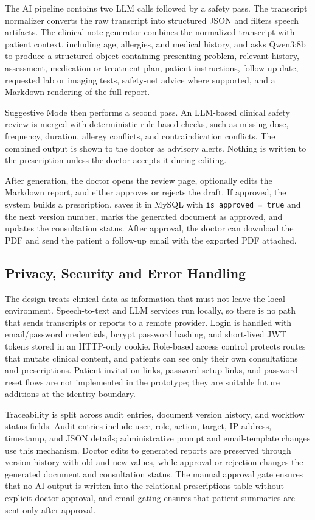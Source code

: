 The AI pipeline contains two LLM calls followed by a safety pass. The transcript normalizer converts the raw transcript into structured JSON and filters speech artifacts. The clinical-note generator combines the normalized transcript with patient context, including age, allergies, and medical history, and asks Qwen3:8b to produce a structured object containing presenting problem, relevant history, assessment, medication or treatment plan, patient instructions, follow-up date, requested lab or imaging tests, safety-net advice where supported, and a Markdown rendering of the full report.

Suggestive Mode then performs a second pass. An LLM-based clinical safety review is merged with deterministic rule-based checks, such as missing dose, frequency, duration, allergy conflicts, and contraindication conflicts. The combined output is shown to the doctor as advisory alerts. Nothing is written to the prescription unless the doctor accepts it during editing.

After generation, the doctor opens the review page, optionally edits the Markdown report, and either approves or rejects the draft. If approved, the system builds a prescription, saves it in MySQL with \texttt{is\_approved = true} and the next version number, marks the generated document as approved, and updates the consultation status. After approval, the doctor can download the PDF and send the patient a follow-up email with the exported PDF attached.

\subsection{Privacy, Security and Error Handling}
\label{subsec:privacy-security-error-handling}

The design treats clinical data as information that must not leave the local environment. Speech-to-text and LLM services run locally, so there is no path that sends transcripts or reports to a remote provider. Login is handled with email/password credentials, bcrypt password hashing, and short-lived JWT tokens stored in an HTTP-only cookie. Role-based access control protects routes that mutate clinical content, and patients can see only their own consultations and prescriptions. Patient invitation links, password setup links, and password reset flows are not implemented in the prototype; they are suitable future additions at the identity boundary.

Traceability is split across audit entries, document version history, and workflow status fields. Audit entries include user, role, action, target, IP address, timestamp, and JSON details; administrative prompt and email-template changes use this mechanism. Doctor edits to generated reports are preserved through version history with old and new values, while approval or rejection changes the generated document and consultation status. The manual approval gate ensures that no AI output is written into the relational prescriptions table without explicit doctor approval, and email gating ensures that patient summaries are sent only after approval.

